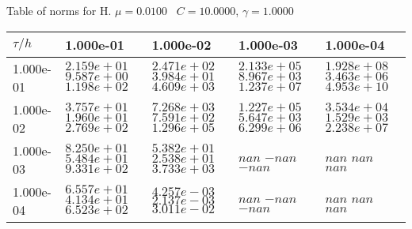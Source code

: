 \begin{center}
Table of norms for H. $\mu = 0.0100$ \, $C = 10.0000$, $\gamma = 1.0000$
  
\begin{tabular}{|p{1in}|p{1in}|p{1in}|p{1in}|p{1in}|} \hline
$\tau / h$ &1.000e-01 &1.000e-02 &1.000e-03 &1.000e-04 \\ \hline 
1.000e-01 & $2.159e+01$  $9.587e+00$  $1.198e+02$  & $2.471e+02$  $3.984e+01$  $4.609e+03$  & $2.133e+05$  $8.967e+03$  $1.237e+07$  & $1.928e+08$  $3.463e+06$  $4.953e+10$  \\ \hline 
1.000e-02 & $3.757e+01$  $1.960e+01$  $2.769e+02$  & $7.268e+03$  $7.591e+02$  $1.296e+05$  & $1.227e+05$  $5.647e+03$  $6.299e+06$  & $3.534e+04$  $1.529e+03$  $2.238e+07$  \\ \hline 
1.000e-03 & $8.250e+01$  $5.484e+01$  $9.331e+02$  & $5.382e+01$  $2.538e+01$  $3.733e+03$  & $nan$  $-nan$  $-nan$  & $nan$  $nan$  $nan$  \\ \hline 
1.000e-04 & $6.557e+01$  $4.134e+01$  $6.523e+02$  & $4.257e-03$  $2.137e-03$  $3.011e-02$  & $nan$  $-nan$  $-nan$  & $nan$  $nan$  $nan$  \\ \hline 

\end{tabular}\\[20pt]
\end{center}
